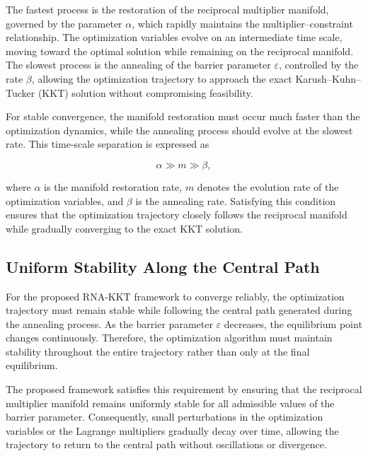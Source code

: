 \documentclass[11pt,onecolumn]{article}
\theoremstyle{definition}
\theoremstyle{remark}
\begin{document}
The fastest process is the restoration of the reciprocal multiplier manifold, governed by the parameter $\alpha$, which rapidly maintains the multiplier--constraint relationship. The optimization variables evolve on an intermediate time scale, moving toward the optimal solution while remaining on the reciprocal manifold. The slowest process is the annealing of the barrier parameter $\varepsilon$, controlled by the rate $\beta$, allowing the optimization trajectory to approach the exact Karush--Kuhn--Tucker (KKT) solution without compromising feasibility.

For stable convergence, the manifold restoration must occur much faster than the optimization dynamics, while the annealing process should evolve at the slowest rate. This time-scale separation is expressed as

\begin{equation}
\alpha \gg m \gg \beta,
\label{eq:timescale}
\end{equation}

where $\alpha$ is the manifold restoration rate, $m$ denotes the evolution rate of the optimization variables, and $\beta$ is the annealing rate. Satisfying this condition ensures that the optimization trajectory closely follows the reciprocal manifold while gradually converging to the exact KKT solution.



\subsection{Uniform Stability Along the Central Path}\label{sec:uniformstability}

For the proposed RNA-KKT framework to converge reliably, the optimization trajectory must remain stable while following the central path generated during the annealing process. As the barrier parameter $\varepsilon$ decreases, the equilibrium point changes continuously. Therefore, the optimization algorithm must maintain stability throughout the entire trajectory rather than only at the final equilibrium.

The proposed framework satisfies this requirement by ensuring that the reciprocal multiplier manifold remains uniformly stable for all admissible values of the barrier parameter. Consequently, small perturbations in the optimization variables or the Lagrange multipliers gradually decay over time, allowing the trajectory to return to the central path without oscillations or divergence.
\end{document}
